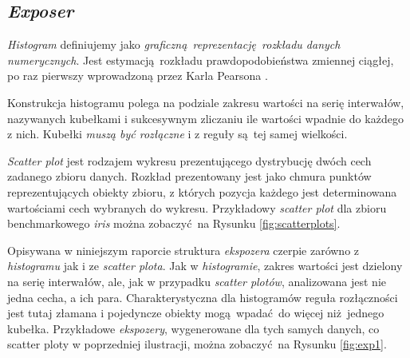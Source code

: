 \documentclass[]{article}
\begin{document}
\subsection{\emph{Exposer}}
\label{exposer}

\emph{Histogram} definiujemy jako \emph{graficzną reprezentację rozkładu danych numerycznych}. Jest estymacją rozkładu prawdopodobieństwa zmiennej ciągłej, po raz pierwszy wprowadzoną przez Karla Pearsona \cite{1895RSPTA.186..343P}. 

Konstrukcja histogramu polega na podziale zakresu wartości na serię interwałów, nazywanych kubełkami i sukcesywnym zliczaniu ile wartości wpadnie do każdego z nich. Kubełki \emph{muszą być rozłączne} i z reguły są tej samej wielkości.

\emph{Scatter plot} jest rodzajem wykresu prezentującego dystrybucję dwóch cech zadanego zbioru danych. Rozkład prezentowany jest jako chmura punktów reprezentujących obiekty zbioru, z których pozycja każdego jest determinowana wartościami cech wybranych do wykresu\cite{jessica2005seeing}. Przykładowy \emph{scatter plot} dla zbioru benchmarkowego \emph{iris} można zobaczyć na Rysunku \ref{fig:scatterplots}.

Opisywana w niniejszym raporcie struktura \emph{ekspozera} czerpie zarówno z \emph{histogramu} jak i ze \emph{scatter plota}. Jak w \emph{histogramie}, zakres wartości jest dzielony na serię interwałów, ale, jak w przypadku \emph{scatter plotów}, analizowana jest nie jedna cecha, a ich para. Charakterystyczna dla histogramów reguła rozłączności jest tutaj złamana i pojedyncze obiekty mogą wpadać do więcej niż jednego kubełka. Przykładowe \emph{ekspozery}, wygenerowane dla tych samych danych, co scatter ploty w poprzedniej ilustracji, można zobaczyć na Rysunku \ref{fig:exp1}.
\end{document}
